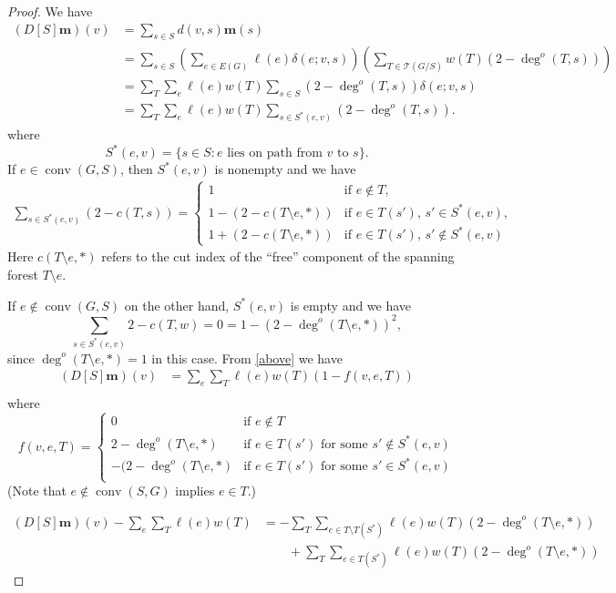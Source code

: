 \documentclass{amsart}
\theoremstyle{definition}
\DeclareMathOperator{\conv}{conv}
\begin{document}
\begin{proof}
We have
\begin{align*}
 (D[S] \mathbf{m})(v) &= \sum_{s \in S} d(v,s) \mathbf{m}(s) \\
 &= \sum_{s \in S} \left( \sum_{e \in E(G)} \ell(e) \delta(e; v,s) \right) \left( \sum_{T \in \mathcal T(G/S)} w(T) (2 - \deg^o(T,s)) \right) \\
 &= \sum_{T } \sum_{e} \ell(e) w(T) \sum_{s \in S} (2 - \deg^o(T, s)) \delta(e; v,s) \\
 &= \sum_{T } \sum_{e} \ell(e) w(T) \sum_{s \in S^*(e,v)} (2 - \deg^o(T, s)) .
\end{align*}
where
$$
S^*(e,v) = \{ s \in S : \text{$e$ lies on path from $v$ to $s$}\}.
$$
If $e \in \conv(G,S)$, then $S^*(e,v)$ is nonempty and we have
\begin{align*}
\sum_{s \in S^*(e,v)}(2 - c(T,s)) = \begin{cases}
1 &\text{if }e \not \in T, \\
1 - (2 - c(T \setminus e, *)) &\text{if } e \in T(s'),\, s'\in S^*(e,v) , \\
1 + (2 - c(T \setminus e, *)) &\text{if } e \in T(s'),\, s' \not\in S^*(e,v)
\end{cases}
\end{align*}
Here $c(T\setminus e, *)$ refers to the cut index of the ``free'' component of the spanning forest $T \setminus e$.

If $e \not\in \conv(G,S)$ on the other hand,
$S^*(e,v)$ is empty and we have
$$ \sum_{s \in S^*(e,v)} 2 - c(T,w) = 0 = 1 - (2 - \deg^o(T\setminus e,*))^2,$$
since $\deg^o(T\setminus e,*) = 1$ in this case. 
From \eqref{above} we have
\begin{align*}
(D[S] \mathbf{m})(v) &= \sum_{e} \sum_{T }  \ell(e) w(T) ( 1 - f(v,e,T) )\\
\end{align*}
where
$$
f(v,e,T) = \begin{cases}
0 &\text{if } e\not\in T\\
2 - \deg^o(T\setminus e,*) &\text{if }  e \in T(s')\text{ for some } s'\not\in S^*(e,v) \\
-(2-\deg^o(T\setminus e,*) &\text{if }  e \in T(s')\text{ for some } s'\in S^*(e,v) \\
\end{cases}
$$
(Note that $e \not \in \conv(S,G)$ implies $e \in T$.)

\begin{align*}
(D[S] \mathbf{m})(v) - \sum_{e} \sum_{T }  \ell(e) w(T) 
&= - \sum_T \sum_{e \in T\setminus T(S^*)} \ell(e) w(T) ( 2 - \deg^o(T\setminus e,*)) \\
&\qquad + \sum_T \sum_{e  \in T(S^*)} \ell(e) w(T) (2 - \deg^o(T\setminus e,*) )
\end{align*}


\end{proof}
\end{document}
